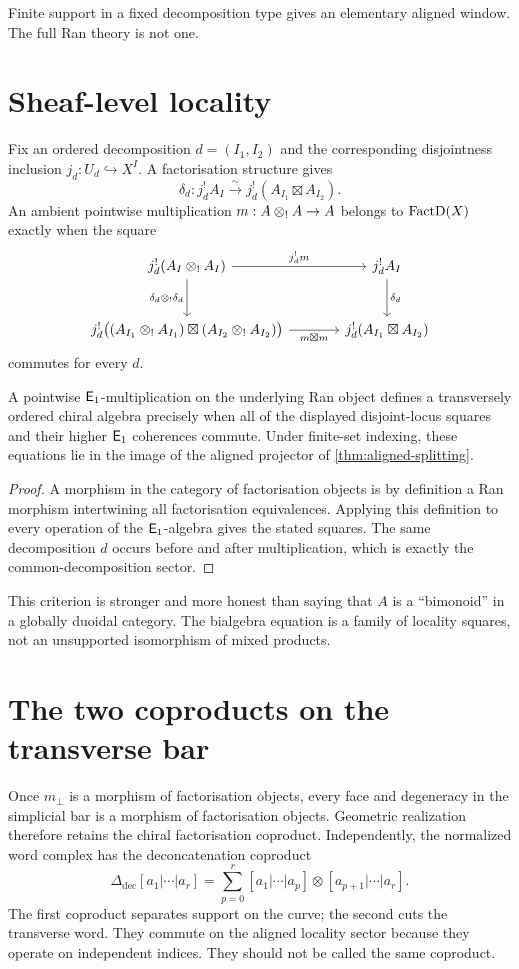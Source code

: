 Finite support in a fixed decomposition type gives an elementary aligned window.  The full Ran theory is not one.

\section{Sheaf-level locality}
Fix an ordered decomposition \(d=(I_1,I_2)\) and the corresponding disjointness inclusion \(j_d:U_d\hookrightarrow X^I\).  A factorisation structure gives
\[
 \delta_d:j_d^!A_I\xrightarrow{\sim}
 j_d^!(A_{I_1}\boxtimes A_{I_2}).
\]
An ambient pointwise multiplication \(m:A\mathbin{\otimes_{!}} A\to A\) belongs to \(\operatorname{FactD}(X)\) exactly when the square
\[
\begin{tikzcd}[column sep=large,row sep=large]
 j_d^!(A_I\tensorpt A_I) \arrow[r,"j_d^!m"] \arrow[d,"\delta_d\tensorpt\delta_d"']
 &j_d^!A_I\arrow[d,"\delta_d"]\\
 j_d^!\bigl((A_{I_1}\tensorpt A_{I_1})\boxtimes
 (A_{I_2}\tensorpt A_{I_2})\bigr)
 \arrow[r,"m\boxtimes m"']
 &j_d^!(A_{I_1}\boxtimes A_{I_2})
\end{tikzcd}
\]
commutes for every \(d\).

\begin{theorem}\label{thm:locality-criterion}
A pointwise \(\mathsf E_1\)-multiplication on the underlying Ran object defines a transversely ordered chiral algebra precisely when all of the displayed disjoint-locus squares and their higher \(\mathsf E_1\) coherences commute.  Under finite-set indexing, these equations lie in the image of the aligned projector of \cref{thm:aligned-splitting}.
\end{theorem}
\begin{proof}
A morphism in the category of factorisation objects is by definition a Ran morphism intertwining all factorisation equivalences.  Applying this definition to every operation of the \(\mathsf E_1\)-algebra gives the stated squares.  The same decomposition \(d\) occurs before and after multiplication, which is exactly the common-decomposition sector.
\end{proof}

This criterion is stronger and more honest than saying that \(A\) is a ``bimonoid'' in a globally duoidal category.  The bialgebra equation is a family of locality squares, not an unsupported isomorphism of mixed products.

\section{The two coproducts on the transverse bar}
Once \(m_\perp\) is a morphism of factorisation objects, every face and degeneracy in the simplicial bar is a morphism of factorisation objects.  Geometric realization therefore retains the chiral factorisation coproduct.  Independently, the normalized word complex has the deconcatenation coproduct
\[
 \Delta_{\mathrm{dec}}[a_1|\cdots|a_r]
 =\sum_{p=0}^r[a_1|\cdots|a_p]\otimes
 [a_{p+1}|\cdots|a_r].
\]
The first coproduct separates support on the curve; the second cuts the transverse word.  They commute on the aligned locality sector because they operate on independent indices.  They should not be called the same coproduct.

